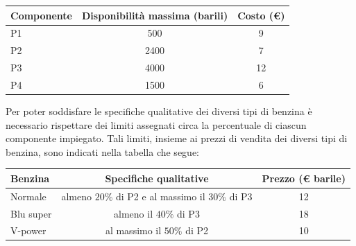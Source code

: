 \documentclass[a4paper]{extarticle}
\renewcommand\arraystretch{}
\begin{document}
\begin{table}[H]
\setlength{\tabcolsep}{8pt}
\renewcommand{\arraystretch}{1.5}
\noindent
\centering
\begin{tabular}{l|c|c}
    Componente & Disponibilità massima (barili) & Costo (€)\\
    \hline
    P1 & 500  & 9\\
    P2 & 2400 & 7\\
    P3 & 4000 & 12\\
    P4 & 1500 & 6\\
\end{tabular}
\end{table}

\vspace{1em}
\noindent
Per poter soddisfare le specifiche qualitative dei diversi tipi di benzina è necessario rispettare dei limiti assegnati circa la percentuale di ciascun componente impiegato. Tali limiti, insieme ai prezzi di vendita dei diversi tipi di benzina, sono indicati nella tabella che segue:

\begin{table}[H]
\setlength{\tabcolsep}{8pt}
\renewcommand{\arraystretch}{1.5}
\noindent
\centering
\begin{tabular}{l|c|c}
    Benzina   & Specifiche qualitative & Prezzo (€ barile)\\
    \hline
    Normale   & almeno $20\%$ di P2 e al massimo il $30\%$ di P3 & 12\\
    Blu super & almeno il $40\%$ di P3                           & 18\\
    V-power   & al massimo il $50\%$ di P2                       & 10\\
\end{tabular}
\end{table}
\end{document}
